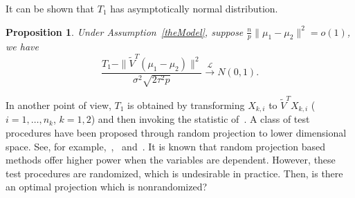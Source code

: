\documentclass[review]{elsarticle}
\theoremstyle{plain}
\newtheorem{proposition}{\quad\quad Proposition}
\theoremstyle{definition}
\theoremstyle{remark}
\begin{document}
It can be shown that $T_1$ has asymptotically normal distribution.
\begin{proposition}\label{oracleTheorem}
    Under Assumption~\ref{theModel}, suppose $\frac{n}{p}\|\mu_1-\mu_2\|^2= o(1)$, we have 
    \begin{equation*}
        \frac{T_1-\|\tilde{V}^T(\mu_1-\mu_2)\|^2}
        {\sigma^2\sqrt{2\tau^2 p}}\xrightarrow{\mathcal{L}}N(0,1).
    \end{equation*}
\end{proposition}

In another point of view, $T_1$ is obtained by transforming $X_{k,i}$ to $\tilde{V}^T X_{k,i}$ ($i=1,\ldots, n_k$, $k=1,2$) and then invoking the statistic of~\cite{Chen2010A}.
A class of test procedures have been proposed through random projection to lower dimensional space. See, for example,~\cite{Lopes2015A},~\cite{Thulin2014A} and~\cite{Srivastava2014RAPTT}.
It is known that random projection based methods offer higher power when the variables are dependent.
However, these test procedures are randomized, which is undesirable in practice.
Then, is there an optimal projection which is nonrandomized?
\end{document}
